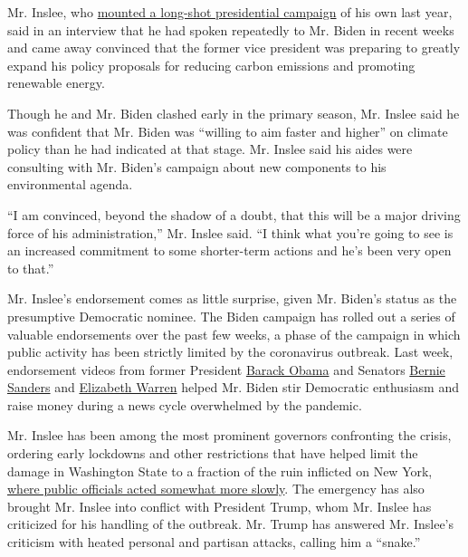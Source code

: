 Mr. Inslee, who
\href{https://www.nytimes3xbfgragh.onion/2019/08/21/us/politics/jay-inslee-2020-campaign.html}{mounted
a long-shot presidential campaign} of his own last year, said in an
interview that he had spoken repeatedly to Mr. Biden in recent weeks and
came away convinced that the former vice president was preparing to
greatly expand his policy proposals for reducing carbon emissions and
promoting renewable energy.

Though he and Mr. Biden clashed early in the primary season, Mr. Inslee
said he was confident that Mr. Biden was ``willing to aim faster and
higher'' on climate policy than he had indicated at that stage. Mr.
Inslee said his aides were consulting with Mr. Biden's campaign about
new components to his environmental agenda.

``I am convinced, beyond the shadow of a doubt, that this will be a
major driving force of his administration,'' Mr. Inslee said. ``I think
what you're going to see is an increased commitment to some shorter-term
actions and he's been very open to that.''

Mr. Inslee's endorsement comes as little surprise, given Mr. Biden's
status as the presumptive Democratic nominee. The Biden campaign has
rolled out a series of valuable endorsements over the past few weeks, a
phase of the campaign in which public activity has been strictly limited
by the coronavirus outbreak. Last week, endorsement videos from former
President
\href{https://www.nytimes3xbfgragh.onion/2020/04/14/us/politics/obama-endorses-biden.html}{Barack
Obama} and Senators
\href{https://www.nytimes3xbfgragh.onion/2020/04/13/us/politics/bernie-sanders-joe-biden-endorsement.html}{Bernie
Sanders} and
\href{https://www.nytimes3xbfgragh.onion/2020/04/15/us/politics/elizabeth-warren-endorse-biden.html}{Elizabeth
Warren} helped Mr. Biden stir Democratic enthusiasm and raise money
during a news cycle overwhelmed by the pandemic.

Mr. Inslee has been among the most prominent governors confronting the
crisis, ordering early lockdowns and other restrictions that have helped
limit the damage in Washington State to a fraction of the ruin inflicted
on New York,
\href{https://www.nytimes3xbfgragh.onion/2020/04/08/nyregion/new-york-coronavirus-response-delays.html}{where
public officials acted somewhat more slowly}. The emergency has also
brought Mr. Inslee into conflict with President Trump, whom Mr. Inslee
has criticized for his handling of the outbreak. Mr. Trump has answered
Mr. Inslee's criticism with heated personal and partisan attacks,
calling him a ``snake.''

